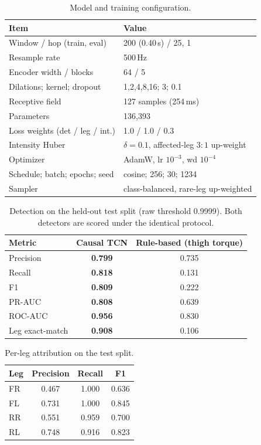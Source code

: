 \begin{table}[t]
\centering
\caption{Model and training configuration.}
\label{tab:hparams}
\footnotesize
\begin{tabular}{@{}ll@{}}
\toprule
Item & Value \\
\midrule
Window / hop (train, eval) & 200 (0.40\,s) / 25, 1 \\
Resample rate & 500\,Hz \\
Encoder width / blocks & 64 / 5 \\
Dilations; kernel; dropout & 1,2,4,8,16; 3; 0.1 \\
Receptive field & 127 samples (254\,ms) \\
Parameters & 136{,}393 \\
Loss weights (det / leg / int.) & 1.0 / 1.0 / 0.3 \\
Intensity Huber & $\delta{=}0.1$, affected-leg $3{:}1$ up-weight \\
Optimizer & AdamW, lr $10^{-3}$, wd $10^{-4}$ \\
Schedule; batch; epochs; seed & cosine; 256; 30; 1234 \\
Sampler & class-balanced, rare-leg up-weighted \\
\bottomrule
\end{tabular}
\end{table}

\begin{table}[t]
\centering
\caption{Detection on the held-out test split (raw threshold 0.9999). Both detectors are scored
under the identical protocol.}
\label{tab:detection}
\footnotesize
\begin{tabular}{@{}lcc@{}}
\toprule
Metric & Causal TCN & Rule-based (thigh torque) \\
\midrule
Precision       & \textbf{0.799} & 0.735 \\
Recall          & \textbf{0.818} & 0.131 \\
F1              & \textbf{0.809} & 0.222 \\
PR-AUC          & \textbf{0.808} & 0.639 \\
ROC-AUC         & \textbf{0.956} & 0.830 \\
Leg exact-match & \textbf{0.908} & 0.106 \\
\bottomrule
\end{tabular}
\end{table}

\begin{table}[t]
\centering
\caption{Per-leg attribution on the test split.}
\label{tab:perleg}
\footnotesize
\begin{tabular}{@{}lccc@{}}
\toprule
Leg & Precision & Recall & F1 \\
\midrule
FR & 0.467 & 1.000 & 0.636 \\
FL & 0.731 & 1.000 & 0.845 \\
RR & 0.551 & 0.959 & 0.700 \\
RL & 0.748 & 0.916 & 0.823 \\
\bottomrule
\end{tabular}
\end{table}
